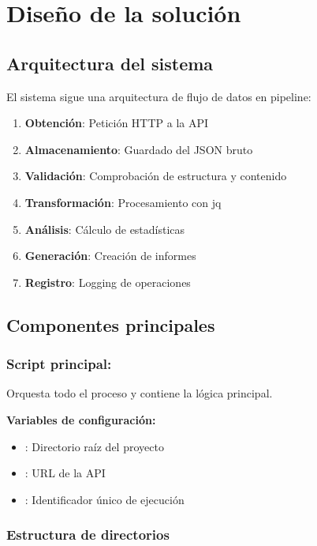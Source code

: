\chapter{Diseño de la solución}

\section{Arquitectura del sistema}

El sistema sigue una arquitectura de flujo de datos en pipeline:

\begin{enumerate}
  \item \textbf{Obtención}: Petición HTTP a la API
  \item \textbf{Almacenamiento}: Guardado del JSON bruto
  \item \textbf{Validación}: Comprobación de estructura y contenido
  \item \textbf{Transformación}: Procesamiento con jq
  \item \textbf{Análisis}: Cálculo de estadísticas
  \item \textbf{Generación}: Creación de informes
  \item \textbf{Registro}: Logging de operaciones
\end{enumerate}

\section{Componentes principales}

\subsection{Script principal: }

Orquesta todo el proceso y contiene la lógica principal.

\textbf{Variables de configuración:}
\begin{itemize}
  \item {}: Directorio raíz del proyecto
  \item {}: URL de la API
  \item {}: Identificador único de ejecución
\end{itemize}

\subsection{Estructura de directorios}


